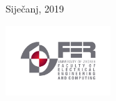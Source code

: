 \documentclass[11pt]{article}
\begin{document}
\begin{titlepage}
	
	
	\vfill\vfill\vfill %
	
	{\large Siječanj, 2019} %
	
	
	\vfill\vfill
	\includegraphics[width=0.3\textwidth]{fer_logo.jpg}\\[1cm] %
	 
	
	\vfill %
	
\end{titlepage}
\end{document}
